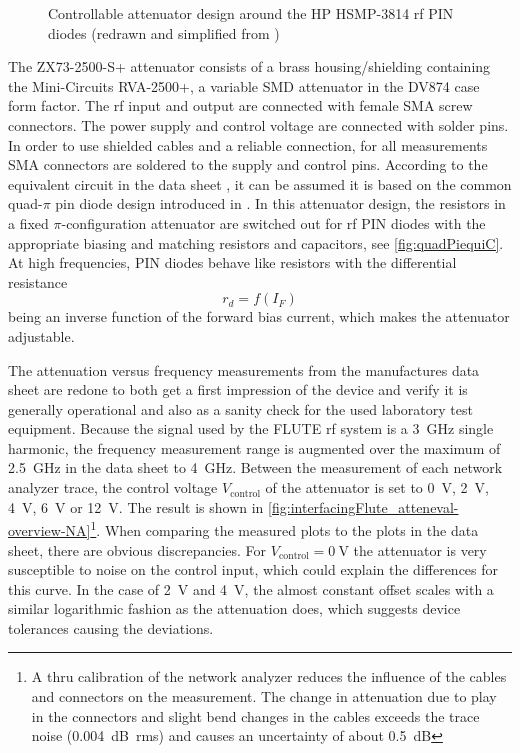 \begin{figure}[tb]
    \centering
	
	\caption[Design of a controllable attenuator]{Controllable attenuator design around the HP HSMP-3814 \gls{rf} PIN diodes (redrawn and simplified from \cite{waughLowCostSurfaceMount1992})}
    \label{fig:quadPiequiC}
\end{figure}




The ZX73-2500-S+ attenuator consists of a brass housing/shielding containing the Mini-Circuits RVA-2500+, a variable SMD attenuator in the DV874 case form factor. The \gls{rf} input and output are connected with female SMA screw connectors. The power supply and control voltage are connected with solder pins. In order to use shielded cables and a reliable connection, for all measurements SMA connectors are soldered to the supply and control pins. According to the equivalent circuit in the data sheet \cite{mini-circuitsZX732500VoltageVariable}, it can be assumed it is based on the common quad-$\pi$ pin diode design introduced in \cite{waughLowCostSurfaceMount1992}. In this attenuator design, the resistors in a fixed $\pi$-configuration attenuator are switched out for \gls{rf} PIN diodes with the appropriate biasing and matching resistors and capacitors, see \autoref{fig:quadPiequiC}. At high frequencies, PIN diodes behave like resistors with the differential resistance
\begin{equation}
r_d = f(I_F)
\end{equation}
being an inverse function of the forward bias current, which makes the attenuator adjustable.

The attenuation versus frequency measurements from the manufactures data sheet are redone to both get a first impression of the device and verify it is generally operational and also as a sanity check for the used laboratory test equipment.
Because the signal used by the FLUTE \gls{rf} system is a \SI{3}{\GHz} single harmonic, the frequency measurement range is augmented over the maximum of \SI{2.5}{\GHz} in the data sheet to \SI{4}{\GHz}.
Between the measurement of each network analyzer trace, the control voltage $V_\text{control}$ of the attenuator is set to \SI{0}{\volt}, \SI{2}{\volt}, \SI{4}{\volt}, \SI{6}{\volt} or \SI{12}{\volt}.
The result is shown in \autoref{fig:interfacingFlute_atteneval-overview-NA}\footnote{A thru calibration of the network analyzer reduces the influence of the cables and connectors on the measurement. The change in attenuation due to play in the connectors and slight bend changes in the cables exceeds the trace noise (\SI{0.004}{\dB rms}) and causes an uncertainty of about \SI{0.5}{\dB}}.
When comparing the measured plots to the plots in the data sheet, there are obvious discrepancies. For $V_\text{control}=\SI{0}{\volt}$ the attenuator is very susceptible to noise on the control input, which could explain the differences for this curve. In the case of \SI{2}{\volt} and \SI{4}{\volt}, the almost constant offset scales with a similar logarithmic fashion as the attenuation does, which suggests device tolerances causing the deviations.


